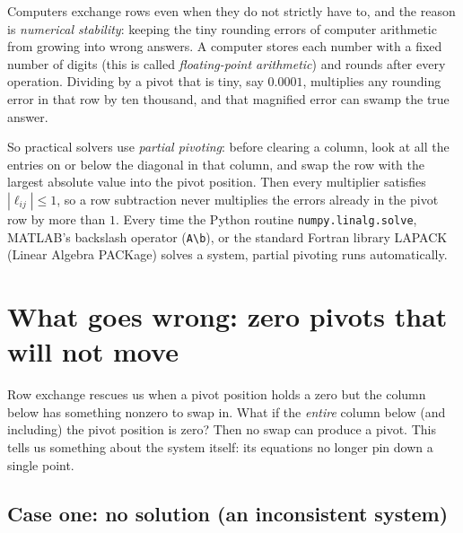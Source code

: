 \begin{applicationbox}
Computers exchange rows even when they do not strictly have to, and the reason is
\emph{numerical stability}: keeping the tiny rounding errors of computer
arithmetic from growing into wrong answers. A computer stores each number with a
fixed number of digits (this is called \emph{floating-point arithmetic}) and
rounds after every operation. Dividing by a pivot that
is tiny, say $0.0001$, multiplies any rounding error in that row by ten thousand,
and that magnified error can swamp the true answer.

So practical solvers use \emph{partial pivoting}: before clearing a column, look
at all the entries on or below the diagonal in that column, and swap the row with
the largest absolute value into the pivot position. Then every multiplier satisfies
$|\ell_{ij}| \le 1$, so a row subtraction never multiplies the errors already in
the pivot row by more than $1$. Every time
the Python routine \texttt{numpy.linalg.solve}, MATLAB's backslash operator
(\texttt{A\textbackslash b}), or the standard Fortran library LAPACK (Linear
Algebra PACKage) solves a system, partial pivoting runs automatically.
\end{applicationbox}

\section{What goes wrong: zero pivots that will not move}

Row exchange rescues us when a pivot position holds a zero but the column below
has something nonzero to swap in. What if the \emph{entire} column below (and
including) the pivot position is zero? Then no swap can produce a pivot. This
tells us something about the system itself: its equations no longer pin down a
single point.

\subsection{Case one: no solution (an inconsistent system)}

